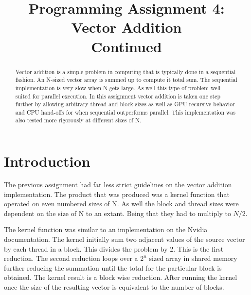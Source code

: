 \documentclass[conference]{IEEEtran}
\begin{document}
\title{Programming Assignment 4: Vector Addition \\ Continued}

\author{
}

\maketitle

\begin{abstract}
Vector addition is a simple problem in computing that is typically done in a sequential fashion. An N-sized vector array is summed up to compute it total sum. The sequential implementation is very slow when N gets large. As well this type of problem well suited for parallel execution. In this assignment vector addition is taken one step further by allowing arbitrary thread and block sizes as well as GPU recursive behavior and CPU hand-offs for when sequential outperforms parallel. This implementation was also tested more rigorously at different sizes of N.
\end{abstract}

\IEEEpeerreviewmaketitle

\section{Introduction}
The previous assignment had far less strict guidelines on the vector addition implementation. The product that was produced was a kernel function that operated on even numbered sizes of N. As well the block and thread sizes were dependent on the size of N to an extant. Being that they had to multiply to $N/2$.

The kernel function was similar to an implementation on the Nvidia documentation. The kernel initially sum two adjacent values of the source vector by each thread in a block. This divides the problem by 2. This is the first reduction. The second reduction loops over a $2^n$ sized array in shared memory further reducing the summation until the total for the particular block is obtained. The kernel result is a block wise reduction. After running the kernel once the size of the resulting vector is equivalent to the number of blocks.
\end{document}
